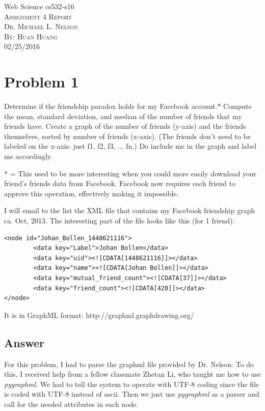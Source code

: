 \documentclass[12pt]{article}
\begin{document}
\begin{titlepage}
	\begin{center}
	\Huge{Web Science cs532-s16}\\
	[0.25in]
	\textsc{\Large Assignment 4 Report}\\
	\textsc{\normalsize Dr. Michael L. Nelson}\\
	[4.25in]
	\textsc{\normalsize By: Huan Huang}\\
	\large 02/25/2016\\
	
	
	\end{center}
\end{titlepage}
\newpage


\section*{Problem 1}

Determine if the friendship paradox holds for my Facebook
account.* Compute the mean, standard deviation, and median of the
number of friends that my friends have.  Create a graph of the
number of friends (y-axis) and the friends themselves, sorted by
number of friends (x-axis).  (The friends don't need to be labeled
on the x-axis: just f1, f2, f3, ... fn.)  Do include me in the graph
and label me accordingly.

* = This used to be more interesting when you could more easily download
your friend's friends data from Facebook.  Facebook now requires each
friend to approve this operation, effectively making it impossible.

I will email to the list the XML file that contains my Facebook
friendship graph ca. Oct, 2013.  The interesting part of the file looks
like this (for 1 friend):

\begin{verbatim}
<node id="Johan_Bollen_1448621116">
        <data key="Label">Johan Bollen</data>
        <data key="uid"><![CDATA[1448621116]]></data>
        <data key="name"><![CDATA[Johan Bollen]]></data>
        <data key="mutual_friend_count"><![CDATA[37]]></data>
        <data key="friend_count"><![CDATA[420]]></data>
</node>
\end{verbatim}

\noindent
It is in GraphML format: http://graphml.graphdrawing.org/



\subsection*{Answer}
For this problem, I had to parse the graphml file provided by Dr. Nelson. To do this, I received help from a fellow classmate Zhetan Li, who taught me how to use \textit{pygraphml}. We had to tell the system to operate with UTF-8 coding since the file is coded with UTF-8 instead of ascii. Then we just use \textit{pygraphml} as a parser and call for the needed attributes in each node.
\end{document}
